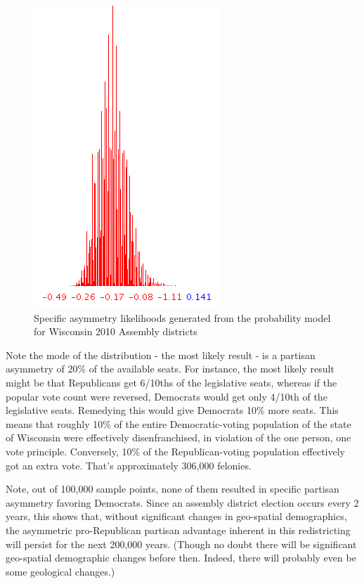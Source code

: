 \documentclass[preprint,12pt]{article}
\begin{document}
\begin{figure}[htb!]
    \begin{center}
        \includegraphics[scale=0.6]{../Figures/WI2010/asymmetry_likelihoods.png}
        \caption{Specific asymmetry likelihoods generated from the probability model for Wisconsin 2010 Assembly districts}\label{fig:LikelihoodsAsymmetry}
    \end{center}
\end{figure}
 
Note the mode of the distribution - the most likely result - is a partisan asymmetry of 20\% of the available seats.  For instance, the most likely result might be that Republicans get 6/10ths of the legislative seats, whereas if the popular vote count were reversed, Democrats would get only 4/10th of the legislative seats.  Remedying this would give Democrats 10\% more seats.  This means that roughly 10\% of the entire Democratic-voting population of the state of Wisconsin were effectively disenfranchised, in violation of the one person, one vote principle.  Conversely, 10\% of the Republican-voting population effectively got an extra vote.  That's approximately 306,000 felonies.
 
Note, out of 100,000 sample points, none of them resulted in specific partisan asymmetry favoring Democrats.  Since an assembly district election occurs every 2 years, this shows that, without significant changes in geo-spatial demographics, the asymmetric pro-Republican partisan advantage inherent in this redistricting will persist for the next 200,000 years.  (Though no doubt there will be significant geo-spatial demographic changes before then.  Indeed, there will probably even be some geological changes.)
\end{document}
